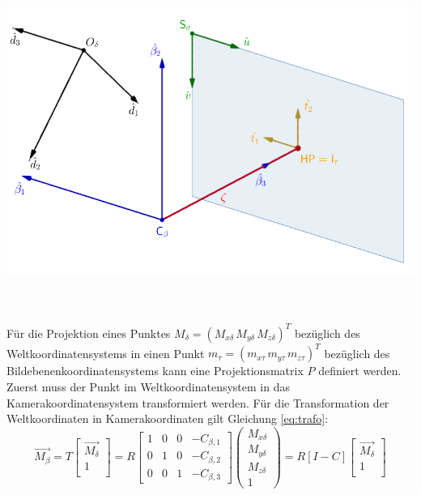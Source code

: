 \begin{minipage}{\linewidth}
	\centering
	\includegraphics[width=0.8\linewidth]{images/UebersichtKoordinatensysteme_beschriftet.png}
	\label{fig:KoordinatensystemeUeberblick}
\end{minipage}\\ \\ 

Für die Projektion eines Punktes $M_\delta=({M_{x \delta}}\,{M_{y \delta}}\,{M_{z \delta}})^T$ bezüglich des Weltkoordinatensystems in einen Punkt $m_\tau=({m_{x \tau}}\,{m_{y \tau}}\,{m_{z \tau}})^T$ bezüglich des Bildebenenkoordinatensystems kann eine Projektionsmatrix $P$ definiert werden.\\

Zuerst muss der Punkt im Weltkoordinatensystem in das Kamerakoordinatensystem transformiert werden. Für die Transformation der Weltkoordinaten in Kamerakoordinaten gilt Gleichung \ref{eq:trafo}:
\begin{equation}
\vec{M_\beta}=T
\begin{bmatrix}
\vec{M_\delta}\\
1\\
\end{bmatrix}=R \begin{bmatrix}1 & 0 & 0 & - C_{\beta,1}\\
0 & 1 & 0& - C_{\beta,2}\\
0 & 0 & 1 & - C_{\beta,3}
\end{bmatrix} 
\begin{pmatrix}
M_{x \delta}\\M_{y \delta}\\ M_{z \delta}\\1
\end{pmatrix}
=R	[I -C] \begin{bmatrix}
\vec{M_\delta}\\
1\\
\end{bmatrix} \label{mbeta}
\end{equation}

